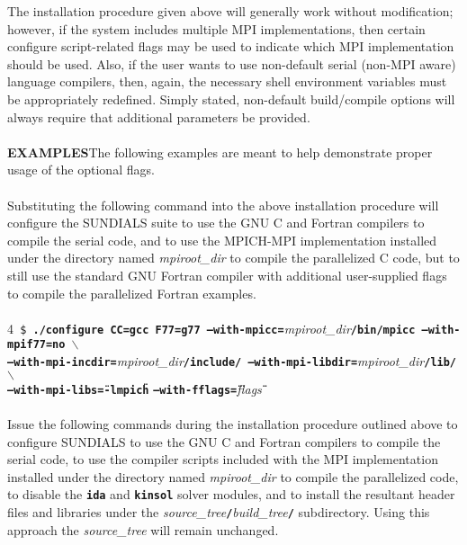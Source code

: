 \documentclass[10pt]{report}
\begin{document}
The installation procedure given above will generally work without modification; however, if the system includes multiple \small MPI \normalsize implementations, then certain configure script-related flags may be used to indicate which \small MPI \normalsize implementation should be used.  Also, if the user wants to use non-default serial (non-\small MPI \normalsize aware) language compilers, then, again, the necessary shell environment variables must be appropriately redefined.  Simply stated, non-default build/compile options will always require that additional parameters be provided.
\\
\\ \setlength{\parindent}{0cm}
\small\textbf{EXAMPLES}\normalsize\hspace*{2ex}The following examples are meant to help demonstrate proper usage of the optional flags.
\\
\\
Substituting the following command into the above installation procedure will configure the \small SUNDIALS \normalsize suite to use the \small GNU \normalsize C and Fortran compilers to compile the serial code, and to use the \small MPICH-MPI \normalsize implementation installed under the directory named \textit{mpiroot\_dir} to compile the parallelized C code, but to still use the standard \small GNU \normalsize Fortran compiler with additional user-supplied flags to compile the parallelized Fortran examples.
\\
\\
\small 4\normalsize\texttt{ \$\textbf{ ./configure CC=gcc F77=g77 --with-mpicc=}}\textit{mpiroot\_dir}\texttt{\textbf{/bin/mpicc --with-mpif77=no  $\backslash$}} \\
\hspace*{2ex}\texttt{\textbf{--with-mpi-incdir=}}\textit{mpiroot\_dir}\texttt{\textbf{/include/ --with-mpi-libdir=}}\textit{mpiroot\_dir}\texttt{\textbf{/lib/  $\backslash$}} \\
\hspace*{2ex}\texttt{\textbf{--with-mpi-libs=\"}}\texttt{\textbf{-lmpich}}\texttt{\textbf{\"}} \texttt{\textbf{--with-fflags=\"}}\textit{flags}\texttt{\textbf{\"}}
\\
\\
Issue the following commands during the installation procedure outlined above to configure \small SUNDIALS \normalsize to use the \small GNU \normalsize C and Fortran compilers to compile the serial code, to use the compiler scripts included with the \small MPI \normalsize implementation installed under the directory named \textit{mpiroot\_dir} to compile the parallelized code, to disable the \texttt{\textbf{ida}} and \texttt{\textbf{kinsol}} solver modules, and to install the resultant header files and libraries under the \textit{source\_tree}\texttt{\textbf{/}}\textit{build\_tree}\texttt{\textbf{/}} subdirectory.  Using this approach the \textit{source\_tree} will remain unchanged.
\end{document}
